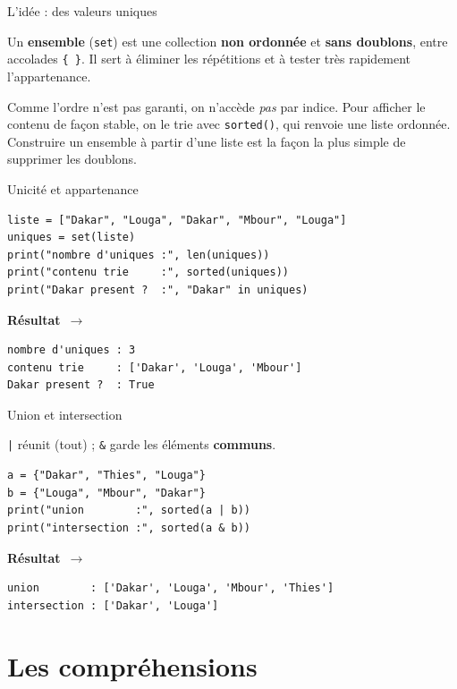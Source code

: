 \documentclass[aspectratio=169,11pt]{beamer}
\newcommand{\resultat}{{\scriptsize\textbf{R\'esultat}~$\rightarrow$}\par\vspace{1pt}}
\begin{document}
\begin{frame}{L'idée : des valeurs uniques}
\begin{ucaddef}
{\small Un \textbf{ensemble} (\texttt{set}) est une collection \textbf{non ordonnée} et \textbf{sans doublons}, entre accolades \texttt{\{ \}}. Il sert à éliminer les répétitions et à tester très rapidement l'appartenance.}
\end{ucaddef}
{\small Comme l'ordre n'est pas garanti, on n'accède \emph{pas} par indice. Pour afficher le contenu de façon stable, on le trie avec \texttt{sorted()}, qui renvoie une liste ordonnée. Construire un ensemble à partir d'une liste est la façon la plus simple de supprimer les doublons.}
\end{frame}

\begin{frame}[fragile]{Unicité et appartenance}
\begin{lstlisting}
liste = ["Dakar", "Louga", "Dakar", "Mbour", "Louga"]
uniques = set(liste)
print("nombre d'uniques :", len(uniques))
print("contenu trie     :", sorted(uniques))
print("Dakar present ?  :", "Dakar" in uniques)
\end{lstlisting}
\resultat
\begin{lstlisting}[style=out]
nombre d'uniques : 3
contenu trie     : ['Dakar', 'Louga', 'Mbour']
Dakar present ?  : True
\end{lstlisting}
\end{frame}

\begin{frame}[fragile]{Union et intersection}
\begin{ucadex}
{\small \texttt{|} réunit (tout) ; \texttt{\&} garde les éléments \textbf{communs}.}
\end{ucadex}
\begin{lstlisting}
a = {"Dakar", "Thies", "Louga"}
b = {"Louga", "Mbour", "Dakar"}
print("union        :", sorted(a | b))
print("intersection :", sorted(a & b))
\end{lstlisting}
\resultat
\begin{lstlisting}[style=out]
union        : ['Dakar', 'Louga', 'Mbour', 'Thies']
intersection : ['Dakar', 'Louga']
\end{lstlisting}
\end{frame}

\section{Les compréhensions}
\end{document}

